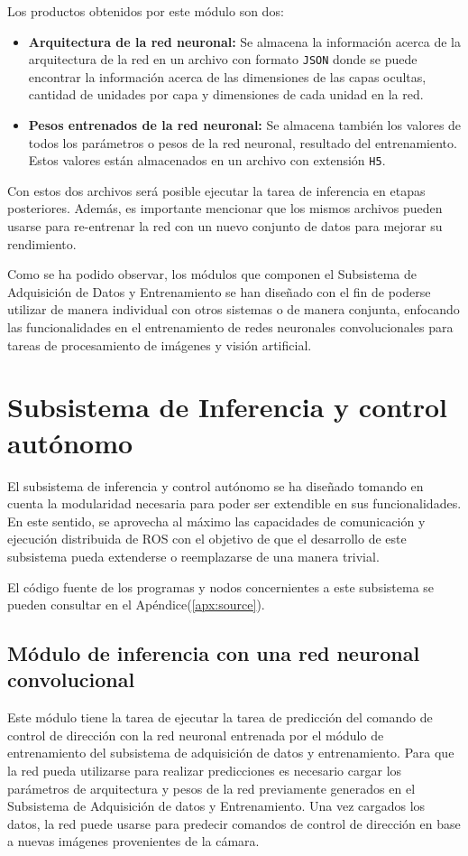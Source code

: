     Los productos obtenidos por este módulo son dos:
    
    \begin{itemize}
        \item \textbf{Arquitectura de la red neuronal:} Se almacena la información acerca de la arquitectura de la red en un archivo con formato \lstinline{JSON} donde se puede encontrar la información acerca de las dimensiones de las capas ocultas, cantidad de unidades por capa y dimensiones de cada unidad en la red.
        \item \textbf{Pesos entrenados de la red neuronal:} Se almacena también los valores de todos los parámetros o pesos de la red neuronal, resultado del entrenamiento. Estos valores están almacenados en un archivo con extensión \lstinline{H5}. 
    \end{itemize}

    Con estos dos archivos será posible ejecutar la tarea de inferencia en etapas posteriores. Además, es importante mencionar que 
    los mismos archivos pueden usarse para re-entrenar la red con un nuevo conjunto de datos para mejorar su rendimiento.

    Como se ha podido observar, los módulos que componen el Subsistema de Adquisición de Datos y Entrenamiento se han diseñado 
    con el fin de poderse utilizar de manera individual con otros sistemas o de manera conjunta, enfocando las funcionalidades 
    en el entrenamiento de redes neuronales convolucionales para tareas de procesamiento de imágenes y visión artificial.

\section{Subsistema de Inferencia y control autónomo}\label{sec:inferencia}
El subsistema de inferencia y control autónomo se ha diseñado tomando en cuenta la modularidad necesaria para poder ser 
extendible en sus funcionalidades. En este sentido, se aprovecha al máximo las capacidades de comunicación y ejecución 
distribuida de ROS con el objetivo de que el desarrollo de este subsistema pueda extenderse o reemplazarse de una manera 
trivial. 

El código fuente de los programas y nodos concernientes a este subsistema se pueden consultar en el Apéndice(\ref{apx:source}).

    \subsection{Módulo de inferencia con una red neuronal convolucional}
    Este módulo tiene la tarea de ejecutar la tarea de predicción del comando de control de dirección con la red neuronal 
    entrenada por el módulo de entrenamiento del subsistema de adquisición de datos y entrenamiento. Para que la red pueda 
    utilizarse para realizar predicciones es necesario cargar los parámetros de arquitectura y pesos de la red previamente 
    generados en el Subsistema de Adquisición de datos y Entrenamiento. Una vez cargados los datos, la red puede usarse 
    para predecir comandos de control de dirección en base a nuevas imágenes provenientes de la cámara.

